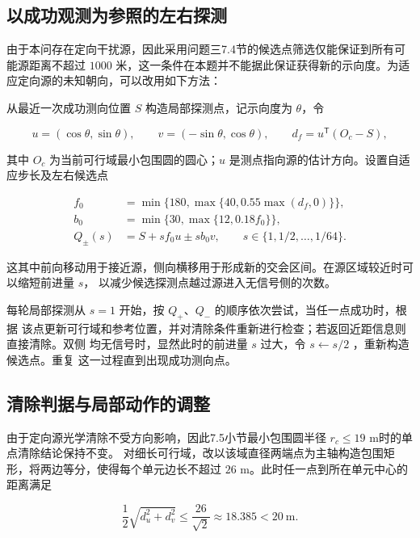 \documentclass[withoutpreface,bwprint]{cumcmthesis} %
\begin{document}
\subsection{以成功观测为参照的左右探测}

由于本问存在定向干扰源，因此采用问题三7.4节的候选点筛选仅能保证到所有可能源距离不超过 $1000$
米，这一条件在本题并不能据此保证获得新的示向度。为适应定向源的未知朝向，可以改用如下方法：

从最近一次成功测向位置 $S$ 构造局部探测点，记示向度为 $\theta$，令

\[
u=(\cos\theta,\sin\theta),\qquad v=(-\sin\theta,\cos\theta),\qquad
d_f=u^{\mathsf T}(O_c-S),
\]

其中 $O_c$ 为当前可行域最小包围圆的圆心；$u$ 是测点指向源的估计方向。设置自适应步长及左右候选点

\begin{equation}\label{eq:p4-probe}
\begin{aligned}
f_0&=\min\{180,\max\{40,0.55\max(d_f,0)\}\},\\
b_0&=\min\{30,\max\{12,0.18f_0\}\},\\
Q_\pm(s)&=S+s f_0u\pm s b_0v,\qquad
s\in\{1,1/2,\ldots,1/64\}.
\end{aligned}
\end{equation}

这其中前向移动用于接近源，侧向横移用于形成新的交会区间。在源区域较近时可以缩短前进量 $s$，
以减少候选探测点越过源进入无信号侧的次数。

每轮局部探测从 $s=1$ 开始，按 $Q_+$、$Q_-$ 的顺序依次尝试，当任一点成功时，根据
该点更新可行域和参考位置，并对清除条件重新进行检查；若返回近距信息则直接清除。双侧
均无信号时，显然此时的前进量 $s$ 过大，令 $s\leftarrow s/2$ ，重新构造候选点。重复
这一过程直到出现成功测向点。

\subsection{清除判据与局部动作的调整}

由于定向源光学清除不受方向影响，因此7.5小节最小包围圆半径 $r_c\le19$ m时的单点清除结论保持不变。
对细长可行域，改以该域直径两端点为主轴构造包围矩形，将两边等分，使得每个单元边长不超过
$26$ m。此时任一点到所在单元中心的距离满足

\begin{equation}\label{eq:p4-grid}
\frac12\sqrt{d_u^2+d_v^2}\le\frac{26}{\sqrt2}\approx18.385<20\ \mathrm m.
\end{equation}
\end{document}
